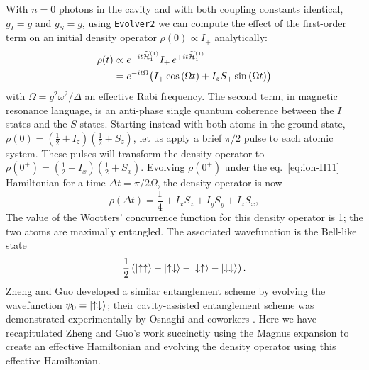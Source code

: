 With $n = 0$ photons in the cavity and with both coupling constants identical, $g_I = g$ and  $g_S = g$, 
using \verb+Evolver2+ we can compute the effect of the first-order term on an initial density operator $\rho(0) \propto I_{+}$ analytically:
\begin{align}
\rho(t) 
  & \propto e^{-i t \widetilde{\cal H}_{1}^{(1)}} I_{+} \, e^{+i t \widetilde{\cal H}_{1}^{(1)}} \\
  & = e^{- i t \Omega} \big(  I_{+} \cos{(\Omega t)} + I_z S_{+} \sin{(\Omega t)} \big) 
\end{align}
with $\Omega = g^2 \omega^2 \big/ \Delta$ an effective Rabi frequency.
The second term, in magnetic resonance language, is an anti-phase single quantum coherence between the $I$ states and the $S$ states.  
Starting instead with both atoms in the ground state, $\rho(0) = (\frac{1}{2} + I_z )(\frac{1}{2} + S_z )$, let us apply a brief $\pi/2$ pulse to each atomic system.
These pulses will transform the density operator to $\rho(0^{+}) = (\frac{1}{2} + I_x )(\frac{1}{2} + S_x)$. 
Evolving $\rho(0^{+})$ under the eq.~\ref{eq:ion-H11} Hamiltonian for a time $\Delta t = \pi \big/ 2 \Omega$, the density operator is now
\[
  \rho(\Delta t) = \frac{1}{4} + I_x S_z + I_y S_y + I_z S_x, 
\]
The value of the Wootters' concurrence function \cite{Wootters1998mar,Rungta2001sep} for this density operator is 1; the two atoms are maximally entangled.
The associated wavefunction is the Bell-like state \cite{Horodecki2009jun}
\[
  \frac{1}{2} \left(  \ket{\uparrow \uparrow} 
    - \ket{\uparrow \downarrow} 
    - \ket{\downarrow \uparrow} 
    - \ket{\downarrow \downarrow} \right).
\]
Zheng and Guo \cite{Zheng2000sep} developed a similar entanglement scheme by evolving the wavefunction $\psi_0 = \ket{\uparrow \downarrow}$; their cavity-assisted entanglement scheme was demonstrated experimentally by Osnaghi and coworkers \cite{Osnaghi2001jun}.
Here we have recapitulated Zheng and Guo's work succinctly using the Magnus expansion to create an effective Hamiltonian and evolving the density operator using this effective Hamiltonian.

